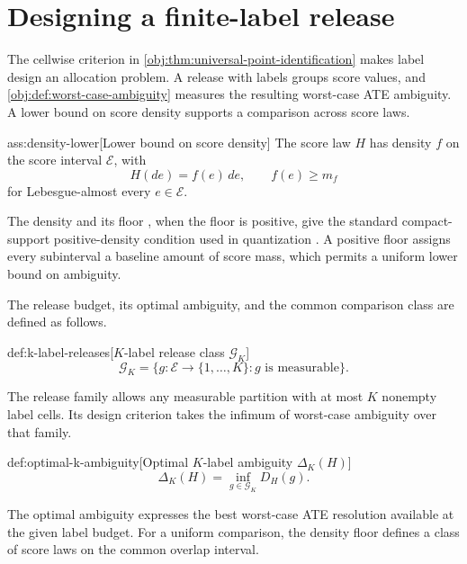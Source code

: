 \documentclass[11pt]{article}
\begin{document}
\section{Designing a finite-label release}

The cellwise criterion in \cref{obj:thm:universal-point-identification} makes label design an allocation problem. A release with  labels groups score values, and \cref{obj:def:worst-case-ambiguity} measures the resulting worst-case ATE ambiguity. A lower bound on score density supports a comparison across score laws.

\begin{assumptionv}{ass:density-lower}[Lower bound on score density]
The score law \(H\) has density \(f\) on the score interval \(\mathcal E\), with
\[
H(de)=f(e)\,de,\qquad f(e)\ge m_f
\]
for Lebesgue-almost every \(e\in\mathcal E\).
\end{assumptionv}

The density  and its floor , when the floor is positive, give the standard compact-support positive-density condition used in quantization \citep{LemaireMontesPages2020}. A positive floor assigns every subinterval a baseline amount of score mass, which permits a uniform lower bound on ambiguity.

The release budget, its optimal ambiguity, and the common comparison class are defined as follows.

\begin{definitionv}{def:k-label-releases}[$K$-label release class $\mathcal G_K$]
\[
\mathcal G_K
=
\bigl\{g:\mathcal E\to\{1,\ldots,K\}:g\text{ is measurable}\bigr\}.
\]
\end{definitionv}

The release family  allows any measurable partition with at most \(K\) nonempty label cells. Its design criterion takes the infimum of worst-case ambiguity over that family.

\begin{definitionv}{def:optimal-k-ambiguity}[Optimal $K$-label ambiguity $\Delta_K(H)$]
\[
\Delta_K(H)=\inf_{g\in\mathcal G_K}D_H(g).
\]
\end{definitionv}

The optimal ambiguity  expresses the best worst-case ATE resolution available at the given label budget. For a uniform comparison, the density floor defines a class of score laws on the common overlap interval.
\end{document}
